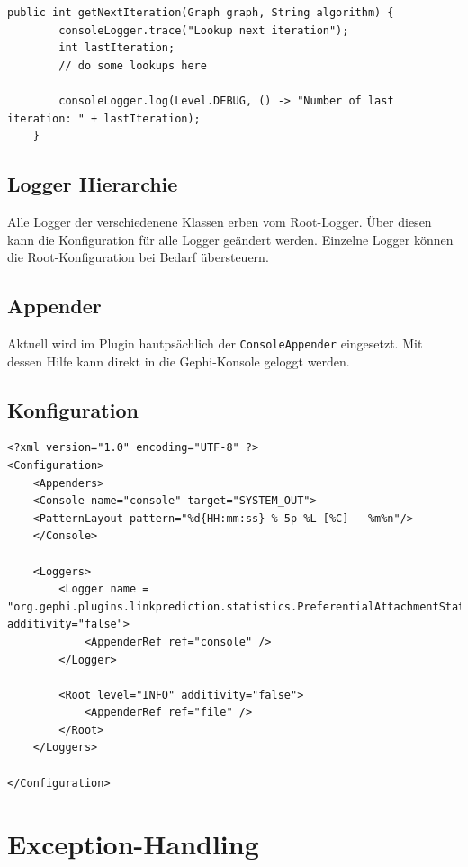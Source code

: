 \begin{lstlisting}[caption={Log-Einträge erzeugen},label=lstLoggerUse]
    public int getNextIteration(Graph graph, String algorithm) {
        consoleLogger.trace("Lookup next iteration");
        int lastIteration;
        // do some lookups here

        consoleLogger.log(Level.DEBUG, () -> "Number of last iteration: " + lastIteration);
    }
\end{lstlisting}

\subsection{Logger Hierarchie}
Alle Logger der verschiedenene Klassen erben vom Root-Logger. Über diesen kann die Konfiguration für alle Logger geändert werden.
Einzelne Logger können die Root-Konfiguration bei Bedarf übersteuern.

\subsection{Appender}
Aktuell wird im Plugin hautpsächlich der \texttt{ConsoleAppender} eingesetzt.
Mit dessen Hilfe kann direkt in die Gephi-Konsole geloggt werden.

\subsection{Konfiguration}

\begin{lstlisting}[caption={log4j.xml},label=lstLoggerCreate]
<?xml version="1.0" encoding="UTF-8" ?>
<Configuration>
    <Appenders>
    <Console name="console" target="SYSTEM_OUT">
    <PatternLayout pattern="%d{HH:mm:ss} %-5p %L [%C] - %m%n"/>
    </Console>

    <Loggers>
        <Logger name = "org.gephi.plugins.linkprediction.statistics.PreferentialAttachmentStatistics" additivity="false">
            <AppenderRef ref="console" />
        </Logger>

        <Root level="INFO" additivity="false">
            <AppenderRef ref="file" />
        </Root>
    </Loggers>

</Configuration>
\end{lstlisting}

\section{Exception-Handling}
\label{exceptionhandling}

